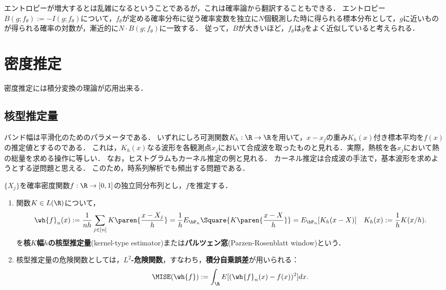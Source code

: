 \documentclass[uplatex,dvipdfmx]{jsreport}
\begin{document}
\begin{remarks}[Boltzmanのエントロピーの確率論的解釈]
    エントロピーが増大するとは乱雑になるということであるが，これは確率論から翻訳することもできる．
    エントロピー$B(g;f_\theta):=-I(g;f_\theta)$について，$f_\theta$が定める確率分布に従う確率変数を独立に$N$個観測した時に得られる標本分布として，$g$に近いものが得られる確率の対数が，漸近的に$N\cdot B(g;f_\theta)$に一致する\cite{Sanov61}．
    従って，$B$が大きいほど，$f_\theta$は$g$をよく近似していると考えられる．
\end{remarks}

\section{密度推定}

\begin{tcolorbox}[colframe=ForestGreen, colback=ForestGreen!10!white,breakable,colbacktitle=ForestGreen!40!white,coltitle=black,fonttitle=\bfseries\sffamily,
title=]
    密度推定には積分変換の理論が応用出来る．
\end{tcolorbox}

\subsection{核型推定量}

\begin{tcolorbox}[colframe=ForestGreen, colback=ForestGreen!10!white,breakable,colbacktitle=ForestGreen!40!white,coltitle=black,fonttitle=\bfseries\sffamily,
title=]
    バンド幅は平滑化のためのパラメータである．
    いずれにしろ可測関数$K_h:\R\to\R$を用いて，$x-x_j$の重み$K_h(x)$付き標本平均を$f(x)$の推定値とするのである．
    これは，$K_h(x)$なる波形を各観測点$x_j$において合成波を取ったものと見れる．実際，熱核を各$x_j$において熱の総量を求める操作に等しい．
    なお，ヒストグラムもカーネル推定の例と見れる．
    カーネル推定は合成波の手法で，基本波形を求めようとする逆問題と思える．
    このため，時系列解析でも頻出する問題である．
\end{tcolorbox}

\begin{model}[核型密度推定モデル]\label{model-for-kernel-type-estimator}
    $\{X_j\}$を確率密度関数$f:\R\to[0,1]$の独立同分布列とし，$f$を推定する．
    \begin{enumerate}
        \item 関数$K\in L(\R)$について，
        \[\wh{f}_n(x):=\frac{1}{nh}\sum_{j\in[n]}K\paren{\frac{x-X_j}{h}}=\frac{1}{h}E_{\bP_n}\Square{K\paren{\frac{x-X}{h}}}=E_{\bP_n}[K_h(x-X)]\quad K_h(x):=\frac{1}{h}K(x/h).\]
        を\textbf{核$K$幅$h$の核型推定量}(kernel-type estimator)または\textbf{パルツェン窓}(Parzen-Rosenblatt window)という．
        \item 核型推定量の危険関数としては，\textbf{$L^2$-危険関数}，すなわち，\textbf{積分自乗誤差}が用いられる：
        \[\MISE(\wh{f}):=\int_\R E[(\wh{f}_n(x)-f(x))^2]dx.\]
    \end{enumerate}
\end{model}
\end{document}
